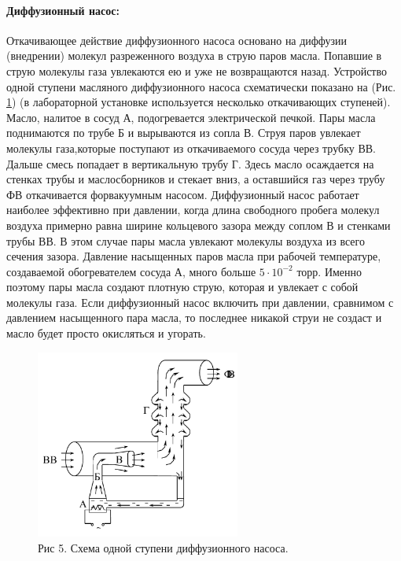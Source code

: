 \documentclass[a4paper]{article}
\begin{document}
    \newpage

    \paragraph{Диффузионный насос:}
    Откачивающее действие диффузионного насоса основано на диффузии (внедрении) молекул разреженного воздуха в струю паров масла. Попавшие в струю молекулы газа увлекаются ею и уже не возвращаются назад. Устройство одной ступени масляного диффузионного насоса схематически показано на (Рис. \ref{ris:diffuzionni_nasos}) (в лабораторной установке используется несколько откачивающих ступеней). Масло, налитое в сосуд А, подогревается электрической печкой. Пары масла поднимаются по трубе Б и вырываются из сопла В. Струя паров увлекает молекулы газа,которые поступают из откачиваемого сосуда через трубку ВВ. Дальше смесь попадает в вертикальную трубу Г. Здесь масло осаждается на стенках трубы и маслосборников и стекает вниз, а оставшийся газ через трубу ФВ откачивается форвакуумным насосом. Диффузионный насос работает наиболее эффективно при давлении, когда длина свободного пробега молекул воздуха примерно равна ширине кольцевого зазора между соплом В и стенками трубы ВВ. В этом случае пары масла увлекают молекулы воздуха из всего сечения зазора. Давление насыщенных паров масла при рабочей температуре, создаваемой обогревателем сосуда А, много больше $5\cdot10^{-2}$ торр. Именно поэтому пары масла создают плотную струю, которая и увлекает с собой молекулы газа. Если диффузионный насос включить при давлении, сравнимом с давлением насыщенного пара масла, то последнее никакой струи не создаст и масло будет просто окисляться и угорать.

    \begin{figure}[h]
    \centering
        \includegraphics[width=0.6\textwidth]{Pictures/diffuzionni_nasos}
        \caption{Рис 5. Схема одной ступени диффузионного насоса.}
        \label{ris:diffuzionni_nasos}
    \end{figure}
	
\end{document}
